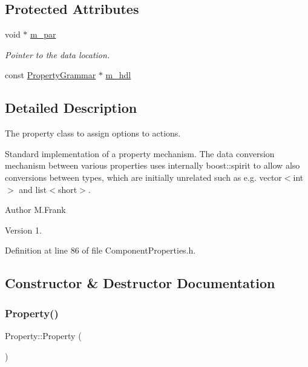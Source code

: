 \subsection*{Protected Attributes}
\begin{DoxyCompactItemize}
\item 
void $\ast$ \hyperlink{class_d_d4hep_1_1_property_a501e760077fb803d75419100c77d3ec4}{m\+\_\+par}
\begin{DoxyCompactList}\small\item\em Pointer to the data location. \end{DoxyCompactList}\item 
const \hyperlink{class_d_d4hep_1_1_property_grammar}{Property\+Grammar} $\ast$ \hyperlink{class_d_d4hep_1_1_property_acae0b73848d2a5c87ff18ef6b564b123}{m\+\_\+hdl}
\end{DoxyCompactItemize}


\subsection{Detailed Description}
The property class to assign options to actions. 

Standard implementation of a property mechanism. The data conversion mechanism between various properties uses internally boost\+::spirit to allow also conversions between types, which are initially unrelated such as e.\+g. vector$<$int$>$ and list$<$short$>$.

\begin{DoxyAuthor}{Author}
M.\+Frank 
\end{DoxyAuthor}
\begin{DoxyVersion}{Version}
1. 
\end{DoxyVersion}


Definition at line 86 of file Component\+Properties.\+h.



\subsection{Constructor \& Destructor Documentation}
\hypertarget{class_d_d4hep_1_1_property_ab029377b86e5b8ae7513bf93f9c9a955}{}\label{class_d_d4hep_1_1_property_ab029377b86e5b8ae7513bf93f9c9a955} 
\subsubsection{\texorpdfstring{Property()}{Property()}\hspace{0.1cm}{\footnotesize\ttfamily [1/3]}}
{\footnotesize\ttfamily Property\+::\+Property (\begin{DoxyParamCaption}{ }\end{DoxyParamCaption})}



